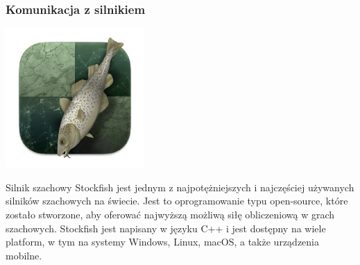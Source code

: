 \documentclass[12pt,a4paper]{article}
\begin{document}
\newpage

\subsubsection{Komunikacja z silnikiem}

\begin{minipage}[t]{0.2\textwidth} 
    \vspace{0pt} 
    \centering
    \includegraphics[width=\linewidth]{images/stockfish_logo.png} 
\end{minipage} 
\hfill 
\begin{minipage}[t]{0.7\textwidth} 
    \vspace{0pt} 
    \raggedright 
    Silnik szachowy Stockfish jest jednym z najpotężniejszych i najczęściej używanych silników szachowych na świecie. Jest to oprogramowanie typu open-source, które zostało stworzone, aby oferować najwyższą możliwą siłę obliczeniową w grach szachowych. Stockfish jest napisany w języku C++ i jest dostępny na wiele platform, w tym na systemy Windows, Linux, macOS, a także urządzenia mobilne.
\end{minipage} 
\vspace{1cm}
\end{document}
